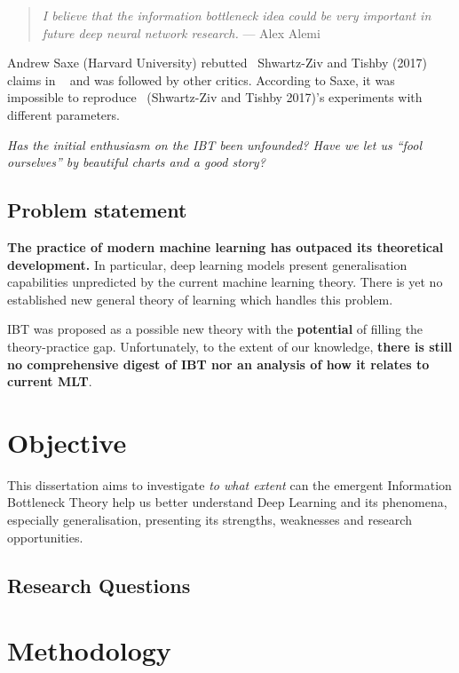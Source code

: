 \documentclass[
  letterpaper,
]{tufte-book}
\begin{document}
\begin{quote}
\emph{I believe that the information bottleneck idea could be very
important in future deep neural network research.} --- Alex Alemi
\end{quote}

Andrew Saxe (Harvard University) rebutted ~Shwartz-Ziv and Tishby (2017)
claims in ~ and was followed by other critics. According to Saxe, it was
impossible to reproduce ~(Shwartz-Ziv and Tishby 2017)'s experiments
with different parameters.

\emph{Has the initial enthusiasm on the {IBT} been unfounded? Have we
let us ``fool ourselves'' by beautiful charts and a good story?}

\hypertarget{problem-statement}{%
\subsection{Problem statement}\label{problem-statement}}

\textbf{The practice of modern machine learning has outpaced its
theoretical development.} In particular, deep learning models present
generalisation capabilities unpredicted by the current machine learning
theory. There is yet no established new general theory of learning which
handles this problem.

{IBT} was proposed as a possible new theory with the \textbf{potential}
of filling the theory-practice gap. Unfortunately, to the extent of our
knowledge, \textbf{there is still no comprehensive digest of {IBT} nor
an analysis of how it relates to current {MLT}}.

\hypertarget{objective}{%
\section{Objective}\label{objective}}

This dissertation aims to investigate \emph{to what extent} can the
emergent Information Bottleneck Theory help us better understand Deep
Learning and its phenomena, especially generalisation, presenting its
strengths, weaknesses and research opportunities.

\hypertarget{research-questions}{%
\subsection{Research Questions}\label{research-questions}}

\hypertarget{methodology}{%
\section{Methodology}\label{methodology}}
\end{document}
